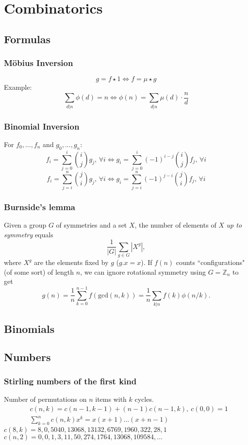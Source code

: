 \chapter{Combinatorics}
\section{Formulas}
\subsection{Möbius Inversion}
$$
g = f \star 1 \Leftrightarrow f= \mu \star g
$$
Example:
$$
\sum_{d|n} \phi(d)=n \Leftrightarrow \phi(n)=\sum_{d|n}\mu(d)\cdot \frac{n}{d}
$$

\subsection{Binomial Inversion}
For $f_0, ..., f_n$ and $g_0, ..., g_n$:
$$
f_i = \sum_{j = 0}^i \binom{i}{j} g_j,\, \forall i \Leftrightarrow g_i = \sum_{j = 0}^i (-1)^{i - j} \binom{i}{j} f_j,\, \forall i
$$
$$
f_i = \sum_{j = i}^n \binom{j}{i} g_j,\, \forall i \Leftrightarrow g_i = \sum_{j = i}^n (-1)^{j - i} \binom{j}{i} f_j,\, \forall i
$$

\subsection{Burnside's lemma} %
Given a group $G$ of symmetries and a set $X$, the number of elements of $X$ \emph{up to symmetry} equals
\small
\[ {\frac {1}{|G|}}\sum _{{g\in G}}|X^{g}|, \]
\normalsize
where $X^{g}$ are the elements fixed by $g$ ($g.x = x$).
If $f(n)$ counts ``configurations" (of some sort) of length $n$, we can ignore rotational symmetry using $G = \mathbb Z_n$ to get
\small
\[ g(n) = \frac 1 n \sum_{k=0}^{n-1}{f(\text{gcd}(n, k))} = \frac 1 n \sum_{k|n}{f(k)\phi(n/k)}. \]
\normalsize

\section{Binomials}

\section{Numbers}
\subsection{Stirling numbers of the first kind} %
Number of permutations on $n$ items with $k$ cycles.
\begin{align*}
& c(n,k) = c(n-1,k-1) + (n-1) c(n-1,k),\ c(0,0) = 1 \\
& \textstyle \sum_{k=0}^n c(n,k)x^k = x(x+1) \dots (x+n-1)
\end{align*}
$c(8,k) = 8, 0, 5040, 13068, 13132, 6769, 1960, 322, 28, 1$ \\
$c(n,2) = 0, 0, 1, 3, 11, 50, 274, 1764, 13068, 109584, \dots$

